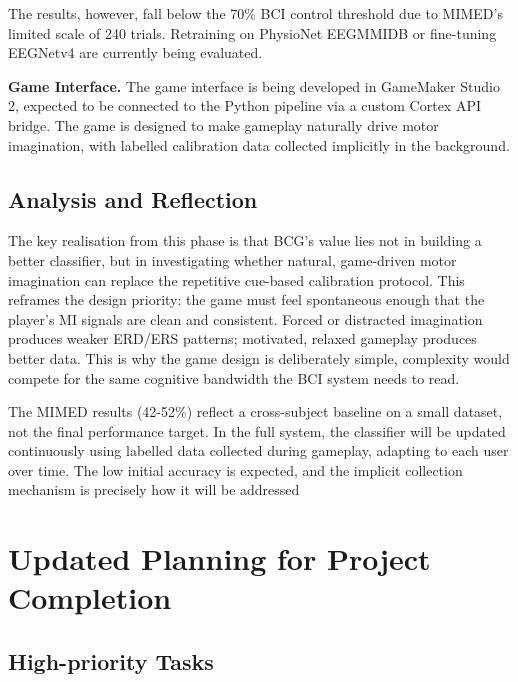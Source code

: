 \documentclass[a4paper, 11pt, openany]{report}
\begin{document}
        The results, however, fall below the 70\% BCI control threshold due to MIMED's limited scale of 240 trials. Retraining on PhysioNet EEGMMIDB or fine-tuning EEGNetv4 are currently being evaluated.


        \textbf{Game Interface.} The game interface is being developed in GameMaker Studio 2, expected to be connected to the Python pipeline via a custom Cortex API bridge. The game is designed to make gameplay naturally drive motor imagination, with labelled calibration data collected implicitly in the background.

    \section{Analysis and Reflection}
       The key realisation from this phase is that BCG's value lies not in building a better classifier, 
       but in investigating whether natural, game-driven motor imagination can replace the repetitive cue-based 
       calibration protocol. This reframes the design priority: the game must feel spontaneous enough that the 
       player's MI signals are clean and consistent. Forced or distracted imagination produces weaker ERD/ERS 
       patterns; motivated, relaxed gameplay produces better data. This is why the game design is deliberately 
       simple, complexity would compete for the same cognitive bandwidth the BCI system needs to read.

        The MIMED results (42-52\%) reflect a cross-subject baseline on a small dataset, not the 
        final performance target. In the full system, the classifier will be updated continuously using 
        labelled data collected during gameplay, adapting to each user over time. The low initial accuracy 
        is expected, and the implicit collection mechanism is precisely how it will be addressed

\chapter{Updated Planning for Project Completion}
    \section{High-priority Tasks}
    
\end{document}
